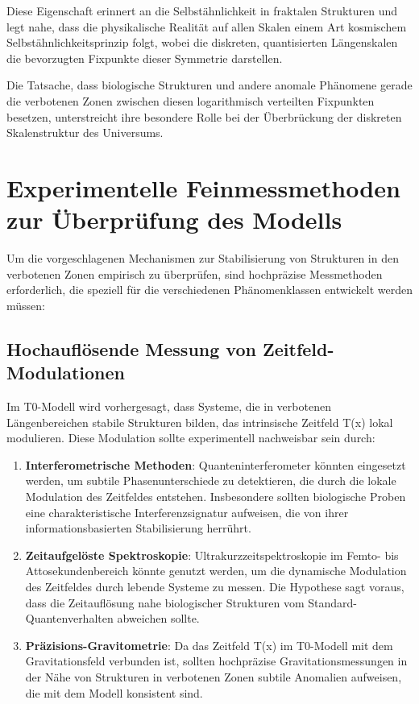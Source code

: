 \documentclass[12pt,a4paper]{article}
\newcommand{\Tfield}{T(x)}
\begin{document}
	Diese Eigenschaft erinnert an die Selbstähnlichkeit in fraktalen Strukturen und legt nahe, dass die physikalische Realität auf allen Skalen einem Art \glqq kosmischem Selbstähnlichkeitsprinzip\grqq{} folgt, wobei die diskreten, quantisierten Längen\-skalen die bevorzugten Fixpunkte dieser Symmetrie darstellen.
	
	Die Tatsache, dass biologische Strukturen und andere anomale Phänomene gerade die verbotenen Zonen zwischen diesen logarithmisch verteilten Fixpunkten besetzen, unterstreicht ihre besondere Rolle bei der Überbrückung der diskreten Skalenstruktur des Universums.
	
	\section{Experimentelle Feinmessmethoden zur Überprüfung des Modells}
	\label{sec:feinmessmethoden}
	
	Um die vorgeschlagenen Mechanismen zur Stabilisierung von Strukturen in den verbotenen Zonen empirisch zu überprüfen, sind hochpräzise Messmethoden erforderlich, die speziell für die verschiedenen Phänomenklassen entwickelt werden müssen:
	
	\subsection{Hochauflösende Messung von Zeitfeld-Modulationen}
	\label{subsec:zeitfeld_modulationen}
	
	Im T0-Modell wird vorhergesagt, dass Systeme, die in verbotenen Längen\-bereichen stabile Strukturen bilden, das intrinsische Zeitfeld \Tfield{} lokal modulieren. Diese Modulation sollte experimentell nachweisbar sein durch:
	
	\begin{enumerate}
		\item \textbf{Interferometrische Methoden}: Quanteninterferometer könnten eingesetzt werden, um subtile Phasenunterschiede zu detektieren, die durch die lokale Modulation des Zeitfeldes entstehen. Insbesondere sollten biologische Proben eine charakteristische Interferenzsignatur aufweisen, die von ihrer informationsbasierten Stabilisierung herrührt.
		
		\item \textbf{Zeitaufgelöste Spektroskopie}: Ultrakurzzeitspektroskopie im Femto- bis Attosekundenbereich könnte genutzt werden, um die dynamische Modulation des Zeitfeldes durch lebende Systeme zu messen. Die Hypothese sagt voraus, dass die Zeitauflösung nahe biologischer Strukturen vom Standard-Quantenverhalten abweichen sollte.
		
		\item \textbf{Präzisions-Gravitometrie}: Da das Zeitfeld \Tfield{} im T0-Modell mit dem Gravitationsfeld verbunden ist, sollten hochpräzise Gravitationsmessungen in der Nähe von Strukturen in verbotenen Zonen subtile Anomalien aufweisen, die mit dem Modell konsistent sind.
	\end{enumerate}
	
\end{document}
